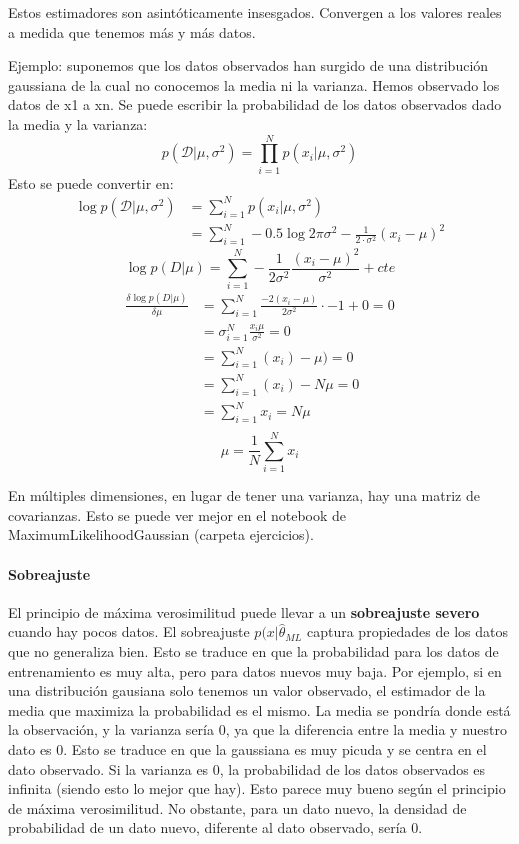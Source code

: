 Estos estimadores son asintóticamente insesgados. Convergen a los valores reales a medida que tenemos más y más datos.

Ejemplo: suponemos que los datos observados han surgido de una distribución gaussiana de la cual no conocemos la media ni la varianza. Hemos observado los datos de x1 a xn. Se puede escribir la probabilidad de los datos observados dado la media y la varianza: 
$$p(\mathcal{D} | \mu, \sigma^2) = \prod^N_{i = 1} p(x_i | \mu, \sigma^2)$$
Esto se puede convertir en:
\begin{align*}
\log p(\mathcal{D} | \mu, \sigma^2) &= \sum^N_{i = 1} p(x_i | \mu, \sigma^2) \\
&= \sum^N_{i = 1} -0.5 \log 2 \pi \sigma^2 - \frac{1}{2 \cdot \sigma^2} (x_i - \mu)^2
\end{align*}
$$\log p(D|\mu) = \sum^N_{i = 1} - \frac{1}{2 \sigma^2} \frac{(x_i - \mu)^2}{\sigma^2} + cte$$
\begin{align*}
\frac{\delta \log p(D|\mu)}{\delta \mu} &= \sum^N_{i=1} \frac{-2(x_i - \mu)}{2 \sigma^2} \cdot -1 + 0 = 0 \\
&= \sigma^N_{i=1} \frac{x_i  \mu}{\sigma^2} = 0 \\
&= \sum^N_{i=1} (x_i) - \mu) = 0 \\
&= \sum^N_{i=1}(x_i) - N \mu = 0 \\
&= \sum^N_{i = 1} x_i = N \mu \\
\end{align*}
$$\mu = \frac{1}{N} \sum^N_{i=1} x_i$$

En múltiples dimensiones, en lugar de tener una varianza, hay una matriz de covarianzas. Esto se puede ver mejor en el notebook de MaximumLikelihoodGaussian (carpeta ejercicios).

\paragraph{Sobreajuste}
El principio de máxima verosimilitud puede llevar a un \textbf{sobreajuste severo} cuando hay pocos datos. El sobreajuste $p(x|\hat{\theta}_{ML}$ captura propiedades de los datos que no generaliza bien. Esto se traduce en que la probabilidad para los datos de entrenamiento es muy alta, pero para datos nuevos muy baja. Por ejemplo, si en una distribución gausiana solo tenemos un valor observado, el estimador de la media que maximiza la probabilidad es el mismo. La media se pondría donde está la observación, y la varianza sería 0, ya que la diferencia entre la media y nuestro dato es 0. Esto se traduce en que la gaussiana es muy picuda y se centra en el dato observado. Si la varianza es 0, la probabilidad de los datos observados es infinita (siendo esto lo mejor que hay). Esto parece muy bueno según el principio de máxima verosimilitud. No obstante, para un dato nuevo, la densidad de probabilidad de un dato nuevo, diferente al dato observado, sería 0. 

